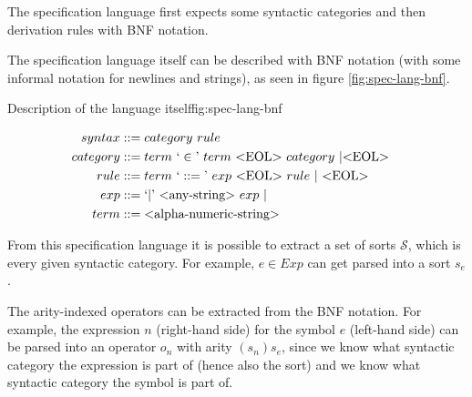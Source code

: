 \documentclass{article}
\begin{document}


The specification language first expects some syntactic categories and then derivation rules with BNF notation.

The specification language itself can be described with BNF notation (with some informal notation for newlines and strings), as seen in figure \ref{fig:spec-lang-bnf}.


\begin{center}
\begin{myfigure}{Description of the language itself}{fig:spec-lang-bnf}
\begin{varwidth}{\textwidth}
\begin{align*}
syntax &::= category \ rule &&\\
category &::= term \ `\in\textrm' \ term \ \text{<EOL>} \ category \ | \text{<EOL>} &&\\
rule &::= term \ `::=\textrm' \ exp \ \text{<EOL>} \ rule \ | \ \text{<EOL>} &&\\
exp &::= `|\textrm' \ \text{<any-string>} \ exp \ | &&\\
term &::= \text{<alpha-numeric-string>}
\end{align*}
\end{varwidth}
\end{myfigure}
\end{center}

From this specification language it is possible to extract a set of sorts $\mathcal{S}$, which is every given syntactic category. For example, $e \in Exp$ can get parsed into a sort $s_{e}$.

The arity-indexed operators can be extracted from the BNF notation. For example, the expression $n$ (right-hand side) for the symbol $e$ (left-hand side) can be parsed into an operator $o_n$ with arity $(s_n)s_e$, since we know what syntactic category the expression is part of (hence also the sort) and we know what syntactic category the symbol is part of. 
\end{document}
